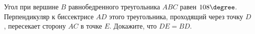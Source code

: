 \begin{ex}
	\begin{condition}
		Угол при вершине \( B  \) равнобедренного треугольника \( ABC  \) равен \( 108\degree\). Перпендикуляр к биссектрисе \( AD  \) этого треугольника, проходящий через точку \( D \), пересекает сторону \( AC \) в точке \( E \). Докажите, что \( DE = BD \).
	\end{condition}
\end{ex}